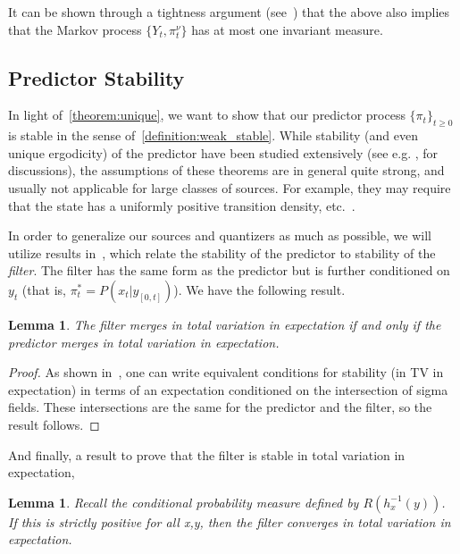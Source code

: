 \documentclass{article}
\newtheorem{lemma}[theorem]{Lemma}
\begin{document}
It can be shown through a tightness argument (see~\cite[Theorem 3]{Stettner}) that the above also implies that the Markov process \( \{Y_t,\pi_t^\nu \} \) has at most one invariant measure.

\subsection{Predictor Stability}
In light of~\ref{theorem:unique}, we want to show that our predictor process \( \{\pi_t\}_{t\ge0} \) is stable in the sense of~\ref{definition:weak_stable}. While stability (and even unique ergodicity) of the predictor have been studied extensively (see e.g. \cite{Chigansky}, \cite{DM} for discussions), the assumptions of these theorems are in general quite strong, and usually not applicable for large classes of sources. For example, they may require that the state has a uniformly positive transition density, etc.~\cite{Chigansky}. %

In order to generalize our sources and quantizers as much as possible, we will utilize results in~\cite{Curtis}, which relate the stability of the predictor to stability of the \emph{filter}. The filter has the same form as the predictor but is further conditioned on \( y_t \) (that is, \( \pi_t^* = P(x_t | y_{[0,t]}) \)). We have the following result.

\begin{lemma}\label{lemma:filter-predictor}\cite[Theorem 2.11]{Curtis}
    The filter merges in total variation in expectation if and only if the predictor merges in total variation in expectation.
\end{lemma}

\begin{proof}
    As shown in~\cite{Curtis}, one can write equivalent conditions for stability (in TV in expectation) in terms of an expectation conditioned on the intersection of sigma fields. These intersections are the same for the predictor and the filter, so the result follows.
\end{proof}

And finally, a result to prove that the filter is stable in total variation in expectation,

\begin{lemma}\label{lemma:nondegenerate}\cite[Corollary 5.5]{Handel}
    Recall the conditional probability measure defined by \( R(h_x^{-1}(y)) \). If this is strictly positive for all x,y, then the filter converges in total variation in expectation.
\end{lemma}
\end{document}
